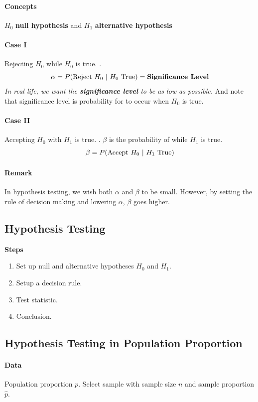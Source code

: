 \documentclass{article}
\begin{document}
			\paragraph{Concepts} $H_0$ \textbf{null hypothesis} and $H_1$ \textbf{alternative hypothesis}
			
			\paragraph{Case I} Rejecting $H_0$ while $H_0$ is true. .
				\[
					\alpha = P(\tx{Reject }H_0\ \vert \ H_0 \tx{ True})= \textbf{Significance Level}
				\]
				\emph{In real life, we want the \textbf{significance level} to be as low as possible.} And note that significance level is probability for  to occur when $H_0$ is true.
				
			\paragraph{Case II} Accepting $H_0$ with $H_1$ is true. . $\beta$ is the probability of  while $H_1$ is true.
				\[
					\beta = P(\tx{Accept }H_0\ \vert \ H_1 \tx{ True})
				\]
			\paragraph{Remark} In hypothesis testing, we wish both $\alpha$ and $\beta$ to be small. However, by setting the rule of decision making and lowering $\alpha$, $\beta$ goes higher.
		\subsection{Hypothesis Testing}
			\textbf{Steps}
			\begin{enumerate}
				\item Set up null and alternative hypotheses $H_0$ and $H_1$.
				\item Setup a decision rule.
				\item Test statistic.
				\item Conclusion.
			\end{enumerate}
			
		\subsection{Hypothesis Testing in Population Proportion}
			\paragraph{Data} Population proportion $p$. Select sample with sample size $n$ and sample proportion $\hat{p}$.
\end{document}
